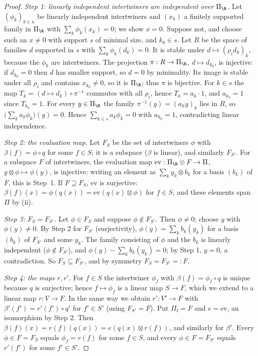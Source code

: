 \begin{proof}
\emph{Step 1: linearly independent intertwiners are independent over $\Pi_\R$.} Let $(\phi_k)_{k\in\kappa}$ be linearly
independent intertwiners and $(x_k)$ a finitely supported family in $\Pi_\R$ with $\sum_k\phi_k(x_k)=0$; we show $x=0$. Suppose
not, and choose such an $x\ne0$ with support $s$ of minimal size, and $k_0\in s$. Let $R$ be the space of families $d$ supported in
$s$ with $\sum_k\phi_k(d_k)=0$. It is stable under $d\mapsto(\rho_id_k)_k$, because the $\phi_k$ are intertwiners. The projection
$\pi:R\to\Pi_\R$, $d\mapsto d_{k_0}$, is injective: if $d_{k_0}=0$ then $d$ has smaller support, so $d=0$ by minimality. Its image
is stable under all $\rho_i$ and contains $x_{k_0}\ne0$, so it is $\Pi_\R$; thus $\pi$ is bijective. For $k\in s$ the map
$T_k=(d\mapsto d_k)\circ\pi^{-1}$ commutes with all $\rho_i$, hence $T_k=a_k\cdot1$, and $a_{k_0}=1$ since $T_{k_0}=1$. For every
$y\in\Pi_\R$ the family $\pi^{-1}(y)=(a_ky)_k$ lies in $R$, so $\bigl(\sum_ka_k\phi_k\bigr)(y)=0$. Hence $\sum_{k\in s}a_k\phi_k=0$
with $a_{k_0}=1$, contradicting linear independence.

\emph{Step 2: the evaluation map.} Let $F_S$ be the set of intertwiners $\phi$ with $\beta(f)=\phi\circ q$ for some $f\in S$; it is
a subspace ($\beta$ is linear), and similarly $F_{S'}$. For a subspace $F$ of intertwiners, the evaluation map
$\mathrm{ev}:\Pi_\R\otimes F\to\Pi$, $y\otimes\phi\mapsto\phi(y)$, is injective: writing an element as $\sum_ky_k\otimes b_k$ for a
basis $(b_k)$ of $F$, this is Step~1. If $F\supseteq F_S$, $\mathrm{ev}$ is surjective: $\beta(f)(x)=\phi(q(x))=\mathrm{ev}(q(x)\otimes\phi)$
for $f\in S$, and these elements span $\Pi$ by (ii).

\emph{Step 3: $F_S=F_{S'}$.} Let $\phi\in F_S$ and suppose $\phi\notin F_{S'}$. Then $\phi\ne0$; choose $y$ with $\phi(y)\ne0$. By Step 2
for $F_{S'}$ (surjectivity), $\phi(y)=\sum_kb_k(y_k)$ for a basis $(b_k)$ of $F_{S'}$ and some $y_k$. The family consisting of $\phi$
and the $b_k$ is linearly independent ($\phi\notin F_{S'}$), and $\phi(y)-\sum_kb_k(y_k)=0$; by Step 1, $y=0$, a contradiction. So
$F_S\subseteq F_{S'}$, and by symmetry $F_S=F_{S'}=:F$.

\emph{Step 4: the maps $r,r'$.} For $f\in S$ the intertwiner $\phi_f$ with $\beta(f)=\phi_f\circ q$ is unique because $q$ is
surjective; hence $f\mapsto\phi_f$ is a linear map $S\to F$, which we extend to a linear map $r:V\to F$. In the same way we obtain
$r':V'\to F$ with $\beta'(f')=r'(f')\circ q'$ for $f'\in S'$ (using $F_{S'}=F$). Put $\Pi_{\mathrm f}=F$ and $e=\mathrm{ev}$, an
isomorphism by Step 2. Then $\beta(f)(x)=r(f)(q(x))=e(q(x)\otimes r(f))$, and similarly for $\beta'$. Every $\phi\in F=F_S$ equals
$\phi_f=r(f)$ for some $f\in S$, and every $\phi\in F=F_{S'}$ equals $r'(f')$ for some $f'\in S'$.
\end{proof}

